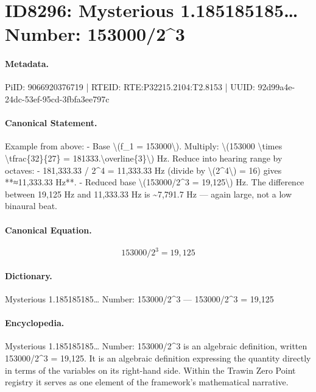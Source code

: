 \section*{ID8296: Mysterious 1.185185185… Number: 153000/2\textasciicircum{}3}
\paragraph{Metadata.}
PiID: 9066920376719 | RTEID: RTE:P32215.2104:T2.8153 | UUID: 92d99a4e-24dc-53ef-95cd-3fbfa3ee797c

\paragraph{Canonical Statement.}
Example from above: - Base \textbackslash{}(f\_1 = 153000\textbackslash{}). Multiply: \textbackslash{}(153000 \textbackslash{}times \textbackslash{}tfrac\{32\}\{27\} = 181333.\textbackslash{}overline\{3\}\textbackslash{}) Hz. Reduce into hearing range by octaves: - 181,333.33 / 2\textasciicircum{}4 = 11,333.33 Hz (divide by \textbackslash{}(2\textasciicircum{}4\textbackslash{}) = 16) gives **≈11,333.33 Hz**. - Reduced base \textbackslash{}(153000/2\textasciicircum{}3 = 19,125\textbackslash{}) Hz. The difference between 19,125 Hz and 11,333.33 Hz is \textasciitilde{}7,791.7 Hz — again large, not a low binaural beat.

\paragraph{Canonical Equation.}
\[
153000/2^3 = 19,125
\]

\paragraph{Dictionary.}
Mysterious 1.185185185… Number: 153000/2\textasciicircum{}3 — 153000/2\textasciicircum{}3 = 19,125

\paragraph{Encyclopedia.}
Mysterious 1.185185185… Number: 153000/2\textasciicircum{}3 is an algebraic definition, written 153000/2\textasciicircum{}3 = 19,125. It is an algebraic definition expressing the quantity directly in terms of the variables on its right-hand side. Within the Trawin Zero Point registry it serves as one element of the framework's mathematical narrative.
